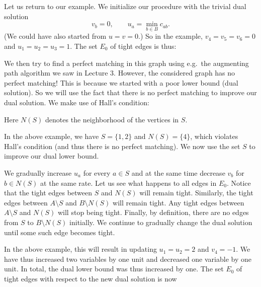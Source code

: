 Let us return to our example. We initialize our procedure with the trivial dual solution
\[
  v_b=0,\qquad u_a=\min_{b\in B}c_{ab}.
\]
(We could have also started from $u=v=0$.) So in the example, $v_4=v_5=v_6=0$ and
$u_1=u_2=u_3=1$. The set $E_0$ of tight edges is thus:

\begin{center}
\end{center}

We then try to find a perfect matching in this graph using e.g.\ the augmenting path algorithm we
saw in Lecture 3. However, the considered graph has no perfect matching! This is because we
started with a poor lower bound (dual solution). So we will use the fact that there is no perfect
matching to improve our dual solution. We make use of Hall's condition:
\label{thm:hall}


Here $N(S)$ denotes the neighborhood of the vertices in $S$.

In the above example, we have $S=\{1,2\}$ and $N(S)=\{4\}$, which violates Hall's condition (and
thus there is no perfect matching). We now use the set $S$ to improve our dual lower bound.

We gradually increase $u_a$ for every $a\in S$ and at the same time decrease $v_b$ for
$b\in N(S)$ at the same rate. Let us see what happens to all edges in $E_0$. Notice that the tight
edges between $S$ and $N(S)$ will remain tight. Similarly, the tight edges between $A\setminus S$
and $B\setminus N(S)$ will remain tight. Any tight edges between $A\setminus S$ and $N(S)$ will
stop being tight. Finally, by definition, there are no edges from $S$ to $B\setminus N(S)$
initially. We continue to gradually change the dual solution until some such edge becomes tight.

In the above example, this will result in updating $u_1=u_2=2$ and $v_4=-1$. We have thus
increased two variables by one unit and decreased one variable by one unit. In total, the dual
lower bound was thus increased by one. The set $E_0$ of tight edges with respect to the new dual
solution is now

